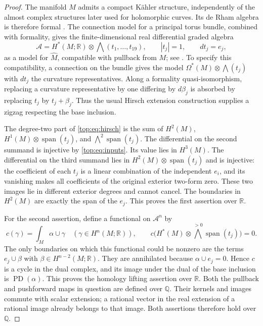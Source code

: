 \documentclass[11pt]{article}
\numberwithin{equation}{section}
\theoremstyle{definition}
\theoremstyle{remark}
\begin{document}
\begin{proof}
The manifold $M$ admits a compact K\"ahler structure, independently of
the almost complex structures later used for holomorphic curves.  Its
de Rham algebra is therefore formal
\cite[Section~6, Main Theorem]{Top:DGMS}.  The connection
model for a principal torus bundle, combined with formality, gives the
finite-dimensional real differential graded algebra
\begin{equation}\label{top:eq:hirsch}
 \mathcal A=H^*(M;\mathbb R)\otimes\bigwedge(t_1,\ldots,t_{19}),
 \qquad |t_j|=1,\qquad dt_j=e_j,
\end{equation}
as a model for $\widehat M$, compatible with pullback from $M$;
see \cite[Hirsch Lemma~(3.1) and the principal-fibration discussion]{Top:DGMS}.
To specify this compatibility, a connection on the bundle gives the
model $\Omega^*(M)\otimes\bigwedge(t_j)$ with $dt_j$ the curvature
representatives.  Along a formality quasi-isomorphism, replacing a
curvature representative by one differing by $d\beta_j$ is absorbed by
replacing $t_j$ by $t_j+\beta_j$.  Thus the usual Hirsch extension
construction supplies a zigzag respecting the base inclusion.

The degree-two part of \eqref{top:eq:hirsch} is the sum of
$H^2(M)$, $H^1(M)\otimes\operatorname{span}(t_j)$, and
$\bigwedge^2\operatorname{span}(t_j)$.  The differential on the second summand is
injective by \eqref{top:eq:inputs}.  Its value lies in $H^3(M)$.
The differential on the third summand lies in
$H^2(M)\otimes\operatorname{span}(t_j)$ and is injective: the coefficient of each
$t_j$ is a linear combination of the independent $e_i$, and its
vanishing makes all coefficients of the original exterior two-form
zero.  These two images lie in different exterior degrees and cannot
cancel.  The boundaries in $H^2(M)$ are exactly the span of the $e_j$.
This proves the first assertion over $\mathbb R$.

For the second assertion, define a functional on $\mathcal A^n$ by
\[
  c(\gamma)=\int_M\alpha\cup\gamma
       \quad(\gamma\in H^n(M;\mathbb R)),
  \qquad
  c\bigl(H^*(M)\otimes\textstyle\bigwedge^{>0}\operatorname{span}(t_j)\bigr)=0.
\]
The only boundaries on which this functional could be nonzero are the
terms $e_j\cup\beta$ with $\beta\in H^{n-2}(M;\mathbb R)$.  They are
annihilated because $\alpha\cup e_j=0$.  Hence $c$ is a cycle in the
dual complex, and its image under the dual of the base inclusion is
$\operatorname{PD}(\alpha)$.  This proves the homology lifting assertion over $\mathbb R$.
Both the pullback and pushforward maps in question are defined over
$\mathbb Q$.  Their kernels and images commute with scalar extension; a
rational vector in the real extension of a rational image already
belongs to that image.  Both assertions therefore hold over $\mathbb Q$.
\end{proof}
\end{document}
